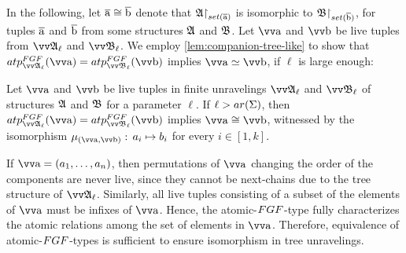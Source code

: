 In the following, let $\overline{\mathrm{a}} \cong \overline{\mathrm{b}}$ denote that $\restr{\str{A}}{\set(\elemtuplea)}$ is isomorphic to $\restr{\str{B}}{\set(\elemtupleb)}$, for tuples $\overline{\mathrm{a}}$ and $\overline{\mathrm{b}}$ from some structures ${\mathfrak{A}}$ and ${\mathfrak{B}}$.
Let $\elemtuptuplea$ and $\elemtuptupleb$ be live tuples from $\unravel{A}_{\ell}$ and $\unravel{B}_{\ell}$.
We employ \cref{lem:companion-tree-like} to show that $\atp{\FGF}{\unravel{A}_{\ell}}{\elemtuptuplea} = \atp{\FGF}{\unravel{B}_{\ell}}{\elemtuptupleb}$ implies $\elemtuptuplea \simeq \elemtuptupleb$, if $\ell$ is large enough:
\begin{lemma}\label{lem:fgf-type-iso}
  Let $\elemtuptuplea$ and $\elemtuptupleb$ be live tuples in finite unravelings $\unravel{A}_{\ell}$ and $\unravel{B}_{\ell}$ of structures ${\mathfrak{A}}$ and ${\mathfrak{B}}$ for a parameter $\ell$.
  If $\ell > \arity(\Sigma)$, then $\atp{\FGF}{\unravel{A}_{\ell}}{\elemtuptuplea} = \atp{\FGF}{\unravel{B}_{\ell}}{\elemtuptupleb}$ implies $\elemtuptuplea \isoeq \elemtuptupleb$, witnessed by the isomorphism $\mu_{(\elemtuptuplea, \elemtuptupleb)}:\, a_{i} \mapsto b_{i}$ for every $i \in [1, k]$.
\end{lemma}
\begin{proofsketch}
  If $\elemtuptuplea = (a_{1}, \ldots, a_{n})$, then permutations of $\elemtuptuplea$ changing the order of the components are never live, since they cannot be next-chains due to the tree structure of $\unravel{A}_{\ell}$.
  Similarly, all live tuples consisting of a subset of the elements of $\elemtuptuplea$ must be infixes of $\elemtuptuplea$.
  Hence, the atomic-$\FGF$-type fully characterizes the atomic relations among the set of elements in $\elemtuptuplea$.
  Therefore, equivalence of atomic-$\FGF$-types is sufficient to ensure isomorphism in tree unravelings.
\end{proofsketch}
